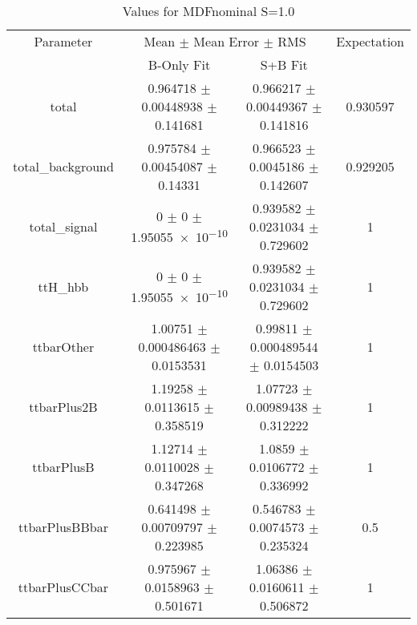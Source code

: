 \begin{table}
\centering
\caption{Values for MDFnominal S=1.0}
\begin{tabular}{cccc}
\toprule
Parameter & \multicolumn{2}{c}{Mean $\pm$ Mean Error $\pm$ RMS} & Expectation\\
 & B-Only Fit & S+B Fit & \\
\midrule
total & \num{0.964718} $\pm$ \num{0.00448938} $\pm$ \num{0.141681} & \num{0.966217} $\pm$ \num{0.00449367} $\pm$ \num{0.141816} & \num{0.930597}\\
total\_background & \num{0.975784} $\pm$ \num{0.00454087} $\pm$ \num{0.14331} & \num{0.966523} $\pm$ \num{0.0045186} $\pm$ \num{0.142607} & \num{0.929205}\\
total\_signal & \num{0} $\pm$ \num{0} $\pm$ \num{1.95055e-10} & \num{0.939582} $\pm$ \num{0.0231034} $\pm$ \num{0.729602} & \num{1}\\
ttH\_hbb & \num{0} $\pm$ \num{0} $\pm$ \num{1.95055e-10} & \num{0.939582} $\pm$ \num{0.0231034} $\pm$ \num{0.729602} & \num{1}\\
ttbarOther & \num{1.00751} $\pm$ \num{0.000486463} $\pm$ \num{0.0153531} & \num{0.99811} $\pm$ \num{0.000489544} $\pm$ \num{0.0154503} & \num{1}\\
ttbarPlus2B & \num{1.19258} $\pm$ \num{0.0113615} $\pm$ \num{0.358519} & \num{1.07723} $\pm$ \num{0.00989438} $\pm$ \num{0.312222} & \num{1}\\
ttbarPlusB & \num{1.12714} $\pm$ \num{0.0110028} $\pm$ \num{0.347268} & \num{1.0859} $\pm$ \num{0.0106772} $\pm$ \num{0.336992} & \num{1}\\
ttbarPlusBBbar & \num{0.641498} $\pm$ \num{0.00709797} $\pm$ \num{0.223985} & \num{0.546783} $\pm$ \num{0.0074573} $\pm$ \num{0.235324} & \num{0.5}\\
ttbarPlusCCbar & \num{0.975967} $\pm$ \num{0.0158963} $\pm$ \num{0.501671} & \num{1.06386} $\pm$ \num{0.0160611} $\pm$ \num{0.506872} & \num{1}\\
\bottomrule
\end{tabular}
\end{table}